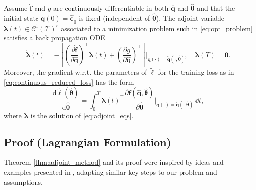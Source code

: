 \begin{theorem}
    \label{thm:adjoint_method}
    Assume $\hat{\mathbf{f}}$ and $g$ are continuously differentiable in both $\hat{\mathbf{q}}$ and $\hat{\bm{\theta}}$ and that the initial state $\hat{\mathbf{q}}(0)=\hat{\mathbf{q}}_0$ is fixed (independent of $\hat{\bm{\theta}}$). The adjoint variable $\bm{\lambda}(t)\in\mathcal{C}^1(\mathcal{T})^r$ associated to a minimization problem such in \eqref{eq:opt_problem} satisfies a back propagation ODE\\ 
    \begin{equation}
        \dot{\bm{\lambda}}(t) = -\left[ \left(\dfrac{\partial \hat{\mathbf{f}}}{\partial\hat{\mathbf{q}}}\right)^{\top}\bm{\lambda}(t) + \left( \dfrac{\partial g}{\partial \hat{\mathbf{q}}} \right)^{\top} \right]\Bigg\vert_{\hat{\mathbf{q}}(\cdot) = \tilde{\mathbf{q}}(\cdot, \hat{\bm{\theta}} ) },\quad\bm{\lambda}(T)=\bm{0}.
        \label{eq:adjoint_eqs}
    \end{equation}
    Moreover, the gradient w.r.t. the parameters of $\tilde\ell$ for the training loss as in \eqref{eq:continuous_reduced_loss} has the form\\
    \begin{equation}
        \frac{\mathrm{d}\tilde{\ell}(\hat{\bm{\theta}})}{\mathrm{d}\hat{\bm{\theta}}}
   = \int_0^T \bm{\lambda}(t)^{\top}\dfrac{\partial\hat{\mathbf{f}}(\hat{\mathbf{q}},\hat{\bm{\theta}})}{\partial\hat{\bm{\theta}}}\Bigg\vert_{\hat{\mathbf{q}}(\cdot) = \tilde{\mathbf{q}}(\cdot, \hat{\bm{\theta}} ) }~\dd t,
        \label{eq:gradient_lagrange}
    \end{equation}
    where $\bm{\lambda}$ is the solution of \eqref{eq:adjoint_eqs}.
\end{theorem}

\subsection*{Proof (Lagrangian Formulation)}
Theorem \eqref{thm:adjoint_method} and its proof were inspired by ideas and examples presented in \cite{bradley2024pde,Antil2018}, adapting similar key steps to our problem and assumptions.

